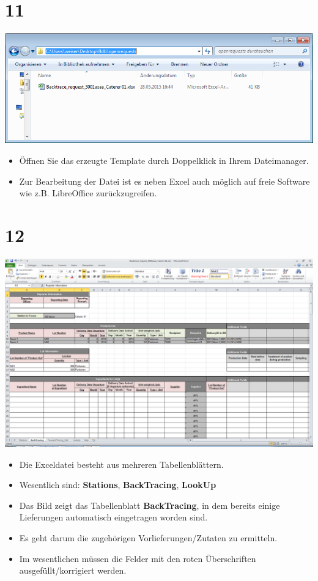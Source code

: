 \documentclass{beamer}
\begin{document}
\section{11}
\begin{frame}
	\begin{center}
  		\includegraphics[height=0.4\textheight]{11.png}
	\end{center}
	\begin{itemize}
		\item Öffnen Sie das erzeugte Template durch Doppelklick in Ihrem Dateimanager.
		\item Zur Bearbeitung der Datei ist es neben Excel auch möglich auf freie Software wie z.B. LibreOffice zurückzugreifen.
	\end{itemize}
\end{frame}

\section{12}
\begin{frame}
	\begin{center}
  		\includegraphics[height=0.5\textheight]{12.png}
	\end{center}
	\begin{itemize}
		\item Die Exceldatei besteht aus mehreren Tabellenblättern.
		\item Wesentlich sind: \textbf{Stations}, \textbf{BackTracing}, \textbf{LookUp}
		\item Das Bild zeigt das Tabellenblatt \textbf{BackTracing}, in dem bereits einige Lieferungen automatisch eingetragen worden sind.
		\item Es geht darum die zugehörigen Vorlieferungen/Zutaten zu ermitteln.
		\item Im wesentlichen müssen die Felder mit den roten Überschriften ausgefüllt/korrigiert werden.
	\end{itemize}
\end{frame}
\end{document}
